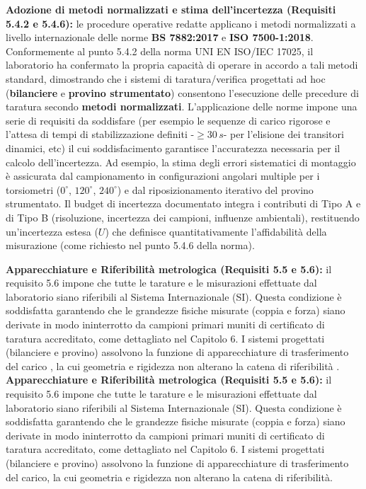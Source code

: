 \documentclass[a4paper, twoside]{article}
\begin{document}
\textbf{Adozione di metodi normalizzati e stima dell'incertezza (Requisiti 5.4.2 e 5.4.6):} le procedure operative redatte applicano i metodi normalizzati a livello internazionale delle norme \textbf{BS 7882:2017} e \textbf{ISO 7500-1:2018}. Conformemente al punto 5.4.2 della norma UNI EN ISO/IEC 17025, il laboratorio ha confermato la propria capacità di operare in accordo a tali metodi standard, dimostrando che i sistemi di taratura/verifica progettati ad hoc (\textbf{bilanciere} e \textbf{provino strumentato}) consentono l'esecuzione delle precedure di taratura secondo \textbf{metodi normalizzati}. L'applicazione delle norme impone una serie di requisiti da soddisfare (per esempio le sequenze di carico rigorose e l'attesa di tempi di stabilizzazione definiti -$\ge 30\,s$- per l'elisione dei transitori dinamici, etc) il cui soddisfacimento garantisce l'accuratezza necessaria per il calcolo dell'incertezza. Ad esempio, la stima degli errori sistematici di montaggio è assicurata dal campionamento in configurazioni angolari multiple per i torsiometri ($0^\circ$, $120^\circ$, $240^\circ$) e dal riposizionamento iterativo del provino strumentato. Il budget di incertezza documentato integra i contributi di Tipo A e di Tipo B (risoluzione, incertezza dei campioni, influenze ambientali), restituendo un'incertezza estesa ($U$) che definisce quantitativamente l'affidabilità della misurazione (come richiesto nel punto 5.4.6 della norma).

\textbf{Apparecchiature e Riferibilità metrologica (Requisiti 5.5 e 5.6):} il requisito 5.6 impone che tutte le tarature e le misurazioni effettuate dal laboratorio siano riferibili al Sistema Internazionale (SI). Questa condizione è soddisfatta garantendo che le grandezze fisiche misurate (coppia e forza) siano derivate in modo ininterrotto da campioni primari muniti di certificato di taratura accreditato, come dettagliato nel Capitolo 6. I sistemi progettati (bilanciere e provino) assolvono la funzione di apparecchiature di trasferimento del carico , la cui geometria e rigidezza non alterano la catena di riferibilità .
\textbf{Apparecchiature e Riferibilità metrologica (Requisiti 5.5 e 5.6):} il requisito 5.6 impone che tutte le tarature e le misurazioni effettuate dal laboratorio siano riferibili al Sistema Internazionale (SI). Questa condizione è soddisfatta garantendo che le grandezze fisiche misurate (coppia e forza) siano derivate in modo ininterrotto da campioni primari muniti di certificato di taratura accreditato, come dettagliato nel Capitolo 6. I sistemi progettati (bilanciere e provino) assolvono la funzione di apparecchiature di trasferimento del carico, la cui geometria e rigidezza non alterano la catena di riferibilità.
\end{document}

